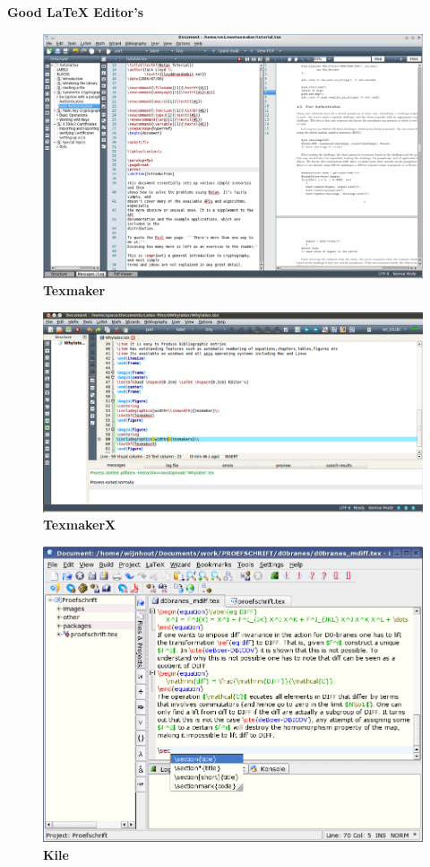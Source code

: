 \documentclass{beamer}
\begin{document}
\begin{frame}
\begin{center}
\textbf{Good \hspace{0.2cm} \LaTeX \hspace{0.2cm} Editor's}
\end{center}
\end{frame}

\begin{figure}
\centering
\includegraphics[width=\linewidth]{texmaker}\\
\textbf{Texmaker}
\end{figure}

\begin{figure}
\centering
\includegraphics[width=\linewidth]{texmakerx}\\
\textbf{TexmakerX}
\end{figure}


\begin{figure}
\centering
\includegraphics[width=\linewidth]{kile}\\
\textbf{Kile}
\end{figure}
\end{document}
